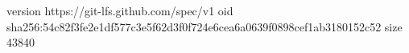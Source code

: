 version https://git-lfs.github.com/spec/v1
oid sha256:54c82f3fe2e1df577c3e5f62d3f0f724e6cea6a0639f0898cef1ab3180152c52
size 43840
